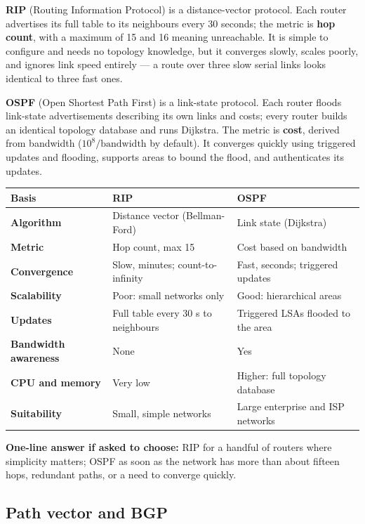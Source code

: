 \documentclass[11pt,a4paper]{article}
\begin{document}
\begin{solbox}
\textbf{RIP} (Routing Information Protocol) is a distance-vector protocol. Each router advertises its full table to its neighbours every 30 seconds; the metric is \textbf{hop count}, with a maximum of 15 and 16 meaning unreachable. It is simple to configure and needs no topology knowledge, but it converges slowly, scales poorly, and ignores link speed entirely --- a route over three slow serial links looks identical to three fast ones.

\textbf{OSPF} (Open Shortest Path First) is a link-state protocol. Each router floods link-state advertisements describing its own links and costs; every router builds an identical topology database and runs Dijkstra. The metric is \textbf{cost}, derived from bandwidth ($10^8/\text{bandwidth}$ by default). It converges quickly using triggered updates and flooding, supports areas to bound the flood, and authenticates its updates.

\begin{center}\small
\begin{tabularx}{\textwidth}{>{\bfseries}p{} X X}
\toprule Basis & RIP & OSPF\\
\midrule
Algorithm & Distance vector (Bellman-Ford) & Link state (Dijkstra)\\
Metric & Hop count, max 15 & Cost based on bandwidth\\
Convergence & Slow, minutes; count-to-infinity & Fast, seconds; triggered updates\\
Scalability & Poor: small networks only & Good: hierarchical areas\\
Updates & Full table every 30 s to neighbours & Triggered LSAs flooded to the area\\
Bandwidth awareness & None & Yes\\
CPU and memory & Very low & Higher: full topology database\\
Suitability & Small, simple networks & Large enterprise and ISP networks\\
\bottomrule
\end{tabularx}
\end{center}

\textbf{One-line answer if asked to choose:} RIP for a handful of routers where simplicity matters; OSPF as soon as the network has more than about fifteen hops, redundant paths, or a need to converge quickly.
\end{solbox}

\subsection{Path vector and BGP}
\end{document}

